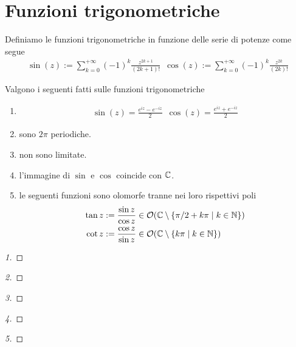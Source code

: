\section{Funzioni trigonometriche}
	
	\begin{definition}
		\label{defn:sin-cos}
		Definiamo le funzioni trigonometriche in funzione delle serie di potenze come segue
		\begin{equation}
		\begin{aligned}
			\sin(z) := \sum^{+\infty}_{k=0} (-1)^k\frac{z^{2k+1}}{(2k+1)!} \;\ \cos(z) := \sum^{+\infty}_{k=0} (-1)^k\frac{z^{2k}}{(2k)!}
		\end{aligned}
		\end{equation}
	\end{definition}
	
	\begin{theorem}
		Valgono i seguenti fatti sulle funzioni trigonometriche
		\begin{enumerate}
			\item 
			\begin{equation}
			\begin{aligned}
				\sin(z) = \frac{e^{iz} - e^{-iz}}{2} \;\ \cos(z) = \frac{e^{iz} + e^{-iz}}{2}
			\end{aligned}
			\end{equation}
			\item sono $2\pi$ periodiche.
			\item non sono limitate.
			\item l'immagine di $\sin$ e $\cos$ coincide con $\mathbb{C}$.
			\item le seguenti funzioni sono olomorfe tranne nei loro rispettivi poli
			\begin{equation}
			\begin{aligned}
				\tan z & := \frac{\sin z}{\cos z} \in \mathcal{O}(\mathbb{C} \setminus \{ \pi /2 + k\pi \mid k \in \mathbb{N} \}) \\
				\cot z & := \frac{\cos z}{\sin z} \in \mathcal{O}(\mathbb{C} \setminus \{k\pi \mid k \in \mathbb{N} \})
			\end{aligned}
			\end{equation}
		\end{enumerate}
	\end{theorem}
	\begin{proof}[1]
	\end{proof}
	\begin{proof}[2]
	\end{proof}
	\begin{proof}[3]
	\end{proof}
	\begin{proof}[4]
	\end{proof}
	\begin{proof}[5]
	\end{proof}
	
